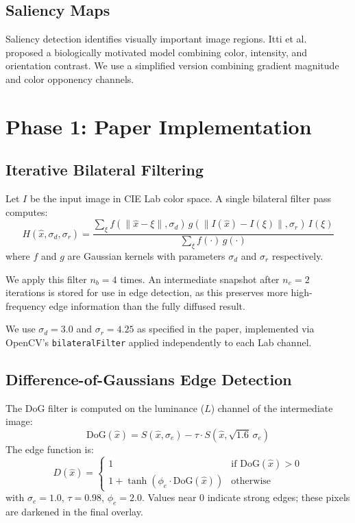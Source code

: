 \documentclass[conference]{IEEEtran}
\begin{document}
\subsection{Saliency Maps}
Saliency detection identifies visually important image regions. Itti et al.~\cite{itti1998} proposed a biologically motivated model combining color, intensity, and orientation contrast. We use a simplified version combining gradient magnitude and color opponency channels.

\section{Phase 1: Paper Implementation}

\subsection{Iterative Bilateral Filtering}

Let $I$ be the input image in CIE Lab color space. A single bilateral filter pass computes:
\begin{equation}
H(\hat{x}, \sigma_d, \sigma_r) = \frac{\sum_{\xi} f(\|\hat{x}-\xi\|, \sigma_d)\, g(\|I(\hat{x})-I(\xi)\|, \sigma_r)\, I(\xi)}{\sum_{\xi} f(\cdot)\, g(\cdot)}
\label{eq:bilateral}
\end{equation}
where $f$ and $g$ are Gaussian kernels with parameters $\sigma_d$ and $\sigma_r$ respectively.

We apply this filter $n_b = 4$ times. An intermediate snapshot after $n_e = 2$ iterations is stored for use in edge detection, as this preserves more high-frequency edge information than the fully diffused result.

We use $\sigma_d = 3.0$ and $\sigma_r = 4.25$ as specified in the paper, implemented via OpenCV's \texttt{bilateralFilter} applied independently to each Lab channel.

\subsection{Difference-of-Gaussians Edge Detection}

The DoG filter is computed on the luminance ($L$) channel of the intermediate image:
\begin{equation}
\text{DoG}(\hat{x}) = S(\hat{x}, \sigma_e) - \tau \cdot S(\hat{x}, \sqrt{1.6}\,\sigma_e)
\end{equation}
The edge function is:
\begin{equation}
D(\hat{x}) = \begin{cases}
1 & \text{if } \text{DoG}(\hat{x}) > 0\\
1 + \tanh(\phi_e \cdot \text{DoG}(\hat{x})) & \text{otherwise}
\end{cases}
\end{equation}
with $\sigma_e = 1.0$, $\tau = 0.98$, $\phi_e = 2.0$. Values near 0 indicate strong edges; these pixels are darkened in the final overlay.
\end{document}
